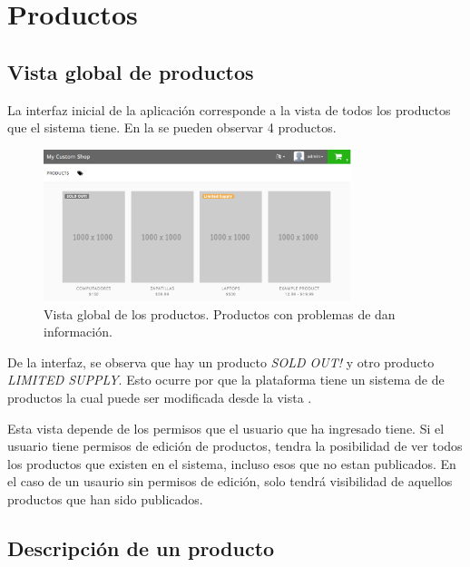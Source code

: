 
\section{Productos}

	\subsection{Vista global de productos}\label{chapter:section:productos:subsection:vista_global}
		La interfaz inicial de la aplicación corresponde a la vista de todos los productos que el sistema tiene. En la  se pueden observar 4 productos.

		\begin{figure}[H]
			\centering
			\includegraphics[width=0.8\textwidth]{figuras/solution/product/global_view/view.png}

			\caption{Vista global de los productos. Productos con problemas de \stock dan información.}
			\label{figure:solution:product:global_view:view}
		\end{figure}

		De la interfaz, se observa que hay un producto \textit{SOLD OUT!} y otro producto \textit{LIMITED SUPPLY}. Esto ocurre por que la plataforma tiene un sistema de \trackingCPT de productos la cual puede ser modificada desde la vista .


		Esta vista depende de los permisos que el usuario que ha ingresado tiene. Si el usuario tiene permisos de edición de productos, tendra la posibilidad de ver todos los productos que existen en el sistema, incluso esos que no estan publicados. En el caso de un usaurio sin permisos de edición, solo tendrá visibilidad de aquellos productos que han sido publicados.

	\subsection{Descripción de un producto}\label{chapter:section:productos:subsection:descripcion}

